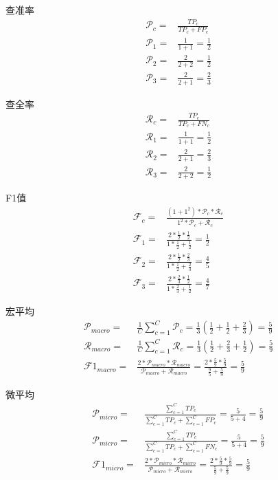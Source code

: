 \documentclass[../main.tex]{subfiles}
\begin{document}
查准率
\begin{align*}
    \mathcal{P}_c
    = & \frac{TP_c}{TP_c + FP_c} \\
    \mathcal{P}_1
    = & \frac{1}{1 + 1} = \frac{1}{2} \\
    \mathcal{P}_2
    = & \frac{2}{2 + 2} = \frac{1}{2} \\
    \mathcal{P}_3
    = & \frac{2}{2 + 1} = \frac{2}{3}
\end{align*}

查全率
\begin{align*}
    \mathcal{R}_c
    = & \frac{TP_c}{TP_c + FN_c} \\
    \mathcal{R}_1
    = & \frac{1}{1 + 1} = \frac{1}{2} \\
    \mathcal{R}_2
    = & \frac{2}{2 + 1} = \frac{2}{3} \\
    \mathcal{R}_3
    = & \frac{2}{2 + 2} = \frac{1}{2}
\end{align*}

F1值
\begin{align*}
    \mathcal{F}_c
    = & \frac{(1 + 1^2) * \mathcal{P}_c * \mathcal{R}_c}
      {1^2 * \mathcal{P}_c + \mathcal{R}_c} \\
    \mathcal{F}_1
    = & \frac{2 * \frac{1}{2} * \frac{1}{2}}
      {1 * \frac{1}{2} + \frac{1}{2}}
    = \frac{1}{2} \\
    \mathcal{F}_2
    = & \frac{2 * \frac{1}{2} * \frac{2}{3}}
      {1 * \frac{1}{2} + \frac{2}{3}}
    = \frac{4}{5} \\
    \mathcal{F}_3
    = & \frac{2 * \frac{2}{3} * \frac{1}{2}}
      {1 * \frac{2}{3} + \frac{1}{2}}
    = \frac{4}{7}
\end{align*}

宏平均
\begin{align*}
    \mathcal{P}_{macro}
    = & \frac{1}{C} \sum^C_{c=1} \mathcal{P}_c
    = \frac{1}{3} (\frac{1}{2} + \frac{1}{2} + \frac{2}{3})
    = \frac{5}{9} \\
    \mathcal{R}_{macro}
    = & \frac{1}{C} \sum^C_{c=1} \mathcal{R}_c
    = \frac{1}{3} (\frac{1}{2} + \frac{2}{3} + \frac{1}{2})
    = \frac{5}{9} \\
    \mathcal{F}1_{macro}
    = & \frac{2 * \mathcal{P}_{macro} * \mathcal{R}_{macro}}
      {\mathcal{P}_{macro} + \mathcal{R}_{macro}}
    = \frac{2 * \frac{5}{9} * \frac{5}{9}}
      {\frac{9}{5} + \frac{5}{9}}
    = \frac{5}{9}
\end{align*}

微平均
\begin{align*}
    \mathcal{P}_{micro}
    = & \frac{\sum^C_{c=1}TP_c}
      {\sum^C_{c=1}TP_c + \sum^C_{c=1}FP_c}
    = \frac{5}{5 + 4}
    = \frac{5}{9} \\
    \mathcal{P}_{micro}
    = & \frac{\sum^C_{c=1}TP_c}
      {\sum^C_{c=1}TP_c + \sum^C_{c=1}FN_c}
    = \frac{5}{5 + 4}
    = \frac{5}{9} \\
    \mathcal{F}1_{micro}
    = & \frac{2 * \mathcal{P}_{micro} * \mathcal{R}_{micro}}
      {\mathcal{P}_{micro} + \mathcal{R}_{micro}}
    = \frac{2 * \frac{5}{9} * \frac{5}{9}}
      {\frac{5}{9} + \frac{5}{9}}
    = \frac{5}{9}
\end{align*}
\end{document}
